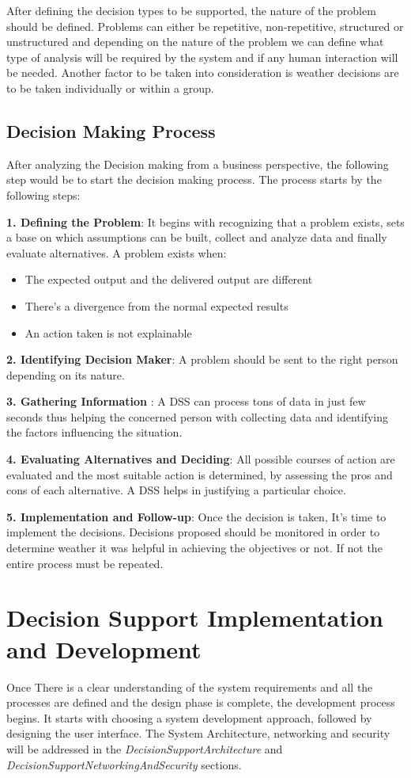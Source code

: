 After defining the decision types to be supported, the nature of the problem should be defined. Problems can either be repetitive, non-repetitive, structured or unstructured and depending on the nature of the problem we can define what type of analysis will be required by the system and if any human interaction will be needed. Another factor to be taken into consideration is weather decisions are to be taken individually or within a group.

\subsection{Decision Making Process}
After analyzing the Decision making from a business perspective, the following step would be to start the decision making process. The process starts by the following steps:

\textbf{1. Defining the Problem}: It begins with recognizing that a problem exists, sets a base on which assumptions can be built, collect and analyze data and finally evaluate alternatives\cite{DSS}. A problem exists when:
\begin{itemize}
\item The expected output and the delivered output are different
\item There’s a divergence from the normal expected results
\item An action taken is not explainable
\end{itemize}

\textbf{2. Identifying Decision Maker}: A problem should be sent to the right person depending on its nature.\cite{DSS}

\textbf{3. Gathering Information} : A DSS can process tons of data in just few seconds thus helping the concerned person with collecting data and identifying the factors influencing the situation.\cite{DSS}

\textbf{4. Evaluating Alternatives and Deciding}: All possible courses of action are evaluated and the most suitable action is determined, by assessing the pros and cons of each alternative. A DSS helps in justifying a particular choice.\cite{DSS}

\textbf{5. Implementation and Follow-up}: Once the decision is taken, It’s time to implement the decisions. Decisions proposed should be monitored in order to determine weather it was helpful in achieving the objectives or not. If not the entire process must be repeated.
\section{Decision Support Implementation and Development}
Once There is a clear understanding of the system requirements and all the processes are defined and the design phase is complete, the development process begins. It starts with choosing a system development approach, followed by designing the user interface. The System Architecture, networking and security will be addressed in the \textit{DecisionSupportArchitecture} and \textit{DecisionSupportNetworkingAndSecurity} sections.\cite{DSS}
